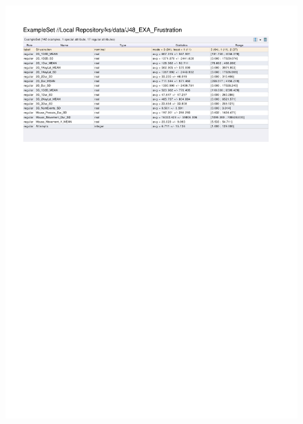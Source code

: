 \begin{figure}[htp]
  \centerline{\includegraphics[trim=0 580 0 60,clip,width=16.09cm]{results/J48_EXA_Frustration.pdf}} \caption{
} \label{J48_K_Frustration}
\end{figure}

